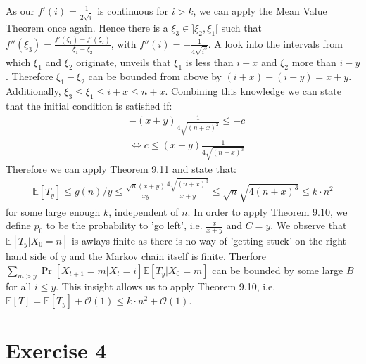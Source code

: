 \documentclass[a4paper,german]{article}
\newcommand{\E}{\mathbb{E}}
\begin{document}
	As our \(f'(i) = \frac{1}{2\sqrt i}\) is continuous for \(i > k\), we can apply the Mean Value Theorem once again. Hence there is a \(\xi_3 \in ]\xi_2, \xi_1[\) such that \(f''(\xi_3) = \frac{f'(\xi_1) - f'(\xi_2)}{\xi_1 - \xi_2} \), with \(f''(i) = - \frac{1}{4\sqrt{i^3}}\). A look into the intervals from which \(\xi_1\) and \(\xi_2\) originate, unveils that \(\xi_1\) is less than \(i+x\) and \(\xi_2\) more than \(i-y\). Therefore \(\xi_1 - \xi_2\) can be bounded from above by \((i+x) - (i - y) = x + y\). Additionally, \(\xi_3 \leq \xi_1 \leq i +x \leq n +x\).  Combining this knowledge we can state that the initial condition is satisfied if:
	\begin{align*}
		&-(x + y)\frac{1}{4\sqrt{(n+x)^3}} \leq -c \\
		&\Leftrightarrow c \leq (x + y)\frac{1}{4\sqrt{(n+x)^3}}
	\end{align*}
	Therefore we can apply Theorem 9.11 and state that:
	\begin{align*}
		\E[T_y] \leq g(n)/y \leq \frac{\sqrt n (x+y)}{xy} \frac{4 \sqrt{(n+x)^3}}{x+y} \leq \sqrt n \sqrt{4(n+x)^3} \leq k \cdot n^2 
	\end{align*}
	for some large enough \(k\), independent of \(n\). In order to apply Theorem 9.10, we define \(p_0\) to be the probability to 'go left', i.e. \(\frac{x}{x+y}\) and \(C = y\). We observe that \(\E[T_y | X_0 =n]\) is awlays finite as there is no way of 'getting stuck' on the right-hand side of \(y\) and the Markov chain itself is finite. Therfore 
	\(\sum_{m > y} \Pr[X_{t+1} = m| X_t = i]\E[T_y|X_0 = m]\) can be bounded by some large \(B\) for all \(i \leq y\). This insight allows us to apply Theorem 9.10, i.e. \(\E[T] = \E[T_y] + \mathcal{O}(1) \leq k \cdot n^2 + \mathcal{O}(1)\).
\section*{Exercise 4}
\end{document}
